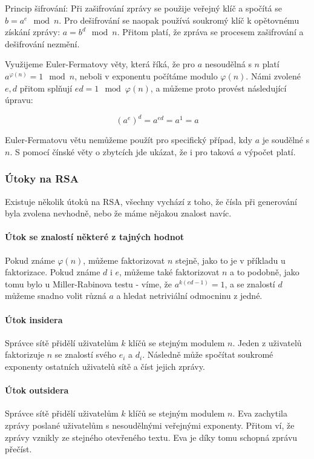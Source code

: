 Princip šifrování: Při zašifrování zprávy se použije veřejný klíč a spočítá se
$b = a^e \mod n$. Pro dešifrování se naopak používá soukromý klíč k opětovnému
získání zprávy: $a = b^d \mod n$. Přitom platí, že zpráva se procesem
zašifrování a dešifrování nezmění.

Využijeme Euler-Fermatovy věty, která říká, že pro $a$ nesoudělná s $n$ platí
$a^{\varphi(n)} = 1 \mod n$, neboli v exponentu počítáme modulo $\varphi(n)$.
Námi zvolené $e, d$ přitom splňují $ed = 1 \mod \varphi(n)$, a můžeme proto
provést následující úpravu:

$$(a^e)^d = a^{ed} = a^1 = a$$

Euler-Fermatovu větu nemůžeme použít pro specifický případ, kdy $a$ je soudělné
s $n$. S pomocí čínské věty o zbytcích jde ukázat, že i pro taková $a$ výpočet
platí.

\subsubsection{Útoky na RSA}
Existuje několik útoků na RSA, všechny vychází z toho, že čísla při generování
byla zvolena nevhodně, nebo že máme nějakou znalost navíc.

\paragraph{Útok se znalostí některé z tajných hodnot}
Pokud známe $\varphi(n)$, můžeme faktorizovat $n$ stejně, jako to je v příkladu
u faktorizace. Pokud známe $d$ i $e$, můžeme také faktorizovat $n$ a to podobně, jako
tomu bylo u Miller-Rabinova testu - víme, že $a^{k(ed - 1)} = 1$, a se znalostí
$d$ můžeme snadno volit různá $a$ a hledat netriviální odmocninu z jedné.

\paragraph{Útok insidera}
Správce sítě přidělí uživatelům $k$ klíčů se stejným modulem $n$. Jeden z
uživatelů faktorizuje $n$ se znalostí svého $e_i$ a $d_i$. Následně může
spočítat soukromé exponenty ostatních uživatelů sítě a číst jejich zprávy.

\paragraph{Útok outsidera}
Správce sítě přidělí uživatelům $k$ klíčů se stejným modulem $n$. Eva zachytila
zprávy poslané uživatelům s nesoudělnými veřejnými exponenty. Přitom ví, že
zprávy vznikly ze stejného otevřeného textu. Eva je díky tomu schopná zprávu
přečíst.

